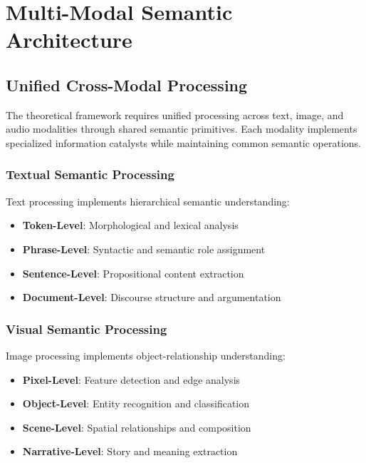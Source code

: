 \documentclass[12pt,a4paper,twoside]{article}
\begin{document}
\section{Multi-Modal Semantic Architecture}

\subsection{Unified Cross-Modal Processing}

The theoretical framework requires unified processing across text, image, and audio modalities through shared semantic primitives. Each modality implements specialized information catalysts while maintaining common semantic operations.

\subsubsection{Textual Semantic Processing}

Text processing implements hierarchical semantic understanding:

\begin{itemize}
\item \textbf{Token-Level}: Morphological and lexical analysis
\item \textbf{Phrase-Level}: Syntactic and semantic role assignment
\item \textbf{Sentence-Level}: Propositional content extraction
\item \textbf{Document-Level}: Discourse structure and argumentation
\end{itemize}

\subsubsection{Visual Semantic Processing}

Image processing implements object-relationship understanding:

\begin{itemize}
\item \textbf{Pixel-Level}: Feature detection and edge analysis
\item \textbf{Object-Level}: Entity recognition and classification
\item \textbf{Scene-Level}: Spatial relationships and composition
\item \textbf{Narrative-Level}: Story and meaning extraction
\end{itemize}
\end{document}
